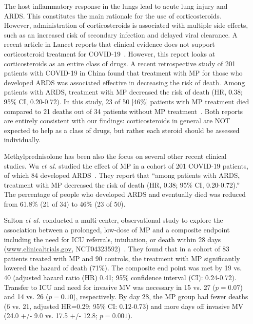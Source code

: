 The host inflammatory response in the lungs lead to acute lung injury and ARDS. This constitutes the main rationale for the use of corticosteroids. However, administration of corticosteroids is associated with multiple side effects, such as an increased risk of secondary infection and delayed viral clearance. A recent article in Lancet reports that clinical evidence does not support corticosteroid treatment for COVID-19~\cite{russell2020clinical}. However, this report looks at corticosteroids as an entire class of drugs. A recent retrospective study of 201 patients with COVID-19 in China found that treatment with MP for those who developed ARDS was associated effective in decreasing the risk of death. Among patients with ARDS, treatment with MP decreased the risk of death (HR, 0.38; 95\% CI, 0.20-0.72). In this study, 23 of 50 [46\%] patients with MP treatment died compared to 21 deaths out of  34 patients without MP treatment~\cite{wu2020risk}. Both reports are entirely consistent with our findings: corticosteroids in general are NOT expected to help as a class of drugs, but rather each steroid should be assessed individually.


Methylprednisolone has been also the focus on several other recent clinical studies. Wu \emph{et al.} studied the effect of MP  in a cohort of 201 COVID-19 patients, of which 84 developed ARDS~\cite{WuRiskFactorsCOVID:2020}.  They report that ``among patients with ARDS, treatment with MP decreased the risk of death (HR, 0.38; 95\% CI, 0.20-0.72).'' The percentage of people who developed ARDS and eventually died was reduced from  61.8\% (21 of 34) to 46\% (23 of 50).

Salton \emph{et al.}  conducted a multi-center, observational study to explore the association between a prolonged, low-dose of MP and a composite endpoint including the need for ICU referrals, intubation, or death within 28 days (\href{www.clinicaltrials.gov}{www.clinicaltrials.gov}, NCT04323592)~\cite{salton2020prolonged}. They found that in a cohort of 83 patients treated with MP and 90 controls, the treatment with MP significantly lowered the hazard of death (71\%). The composite end point was met by 19 vs. 40 (adjusted hazard ratio (HR) 0.41; 95\% confidence interval (CI): 0.24-0.72). Transfer to ICU and need for invasive MV was necessary in 15 vs. 27 ($p=0.07$) and 14 vs. 26 ($p=0.10$), respectively. By day 28, the MP group had fewer deaths (6 vs. 21, adjusted HR=0.29; 95\% CI: 0.12-0.73) and more days off invasive MV (24.0 +/- 9.0 vs. 17.5 +/- 12.8; $p=0.001$).

